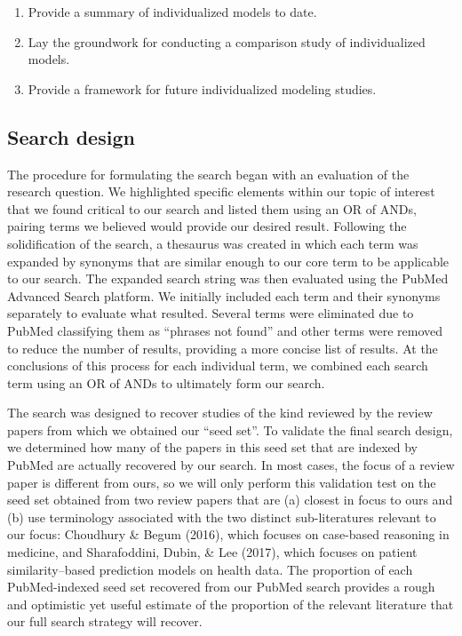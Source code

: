 \documentclass[sn-mathphys,Numbered,pdflatex]{sn-jnl}
\theoremstyle{remark}
\theoremstyle{definition}
\newcommand{\hl}[1]{#1}
\providecommand{\tightlist}{%
  \setlength{\itemsep}{0pt}\setlength{\parskip}{0pt}}
\begin{document}
\begin{enumerate}
\def\labelenumi{\arabic{enumi}.}
\tightlist
\item
  Provide a summary of individualized models to date.
\item
  Lay the groundwork for conducting a comparison study of individualized
  models.
\item
  Provide a framework for future individualized modeling studies.
\end{enumerate}

\subsection*{Search design}\label{search-design}

The procedure for formulating the search began with an evaluation of the
research question. We highlighted specific elements within our topic of
interest that we found critical to our search and listed them using an
OR of ANDs, pairing terms we believed would provide our desired result.
Following the solidification of the search, a thesaurus was created in
which each term was expanded by synonyms that are similar enough to our
core term to be applicable to our search. The expanded search string was
then evaluated using the PubMed Advanced Search platform. We initially
included each term and their synonyms separately to evaluate what
resulted. Several terms were eliminated due to PubMed classifying them
as ``phrases not found'' and other terms were removed to reduce the
number of results, providing a more concise list of results. At the
conclusions of this process for each individual term, we combined each
search term using an OR of ANDs to ultimately form our search.

The search \hl{was} designed to recover studies of the kind
reviewed by the review papers from which we obtained our ``seed set''.
To validate the final search design, we \hl{determined} how many of the
papers in this seed set that are indexed by PubMed are actually
recovered by our search. In most cases, the focus of a review paper is
different from ours, so we will only perform this validation test on the
seed set obtained from two review papers that are (a) closest in focus
to ours and (b) use terminology associated with the two distinct
sub-literatures relevant to our focus: Choudhury \& Begum (2016), which
focuses on case-based reasoning in medicine, and Sharafoddini, Dubin, \&
Lee (2017), which focuses on patient similarity--based prediction models
on health data. The proportion of each PubMed-indexed seed set \hl{recovered} from our PubMed search provides a rough and optimistic yet
useful estimate of the proportion of the relevant literature that our
full search strategy will recover.
\end{document}
